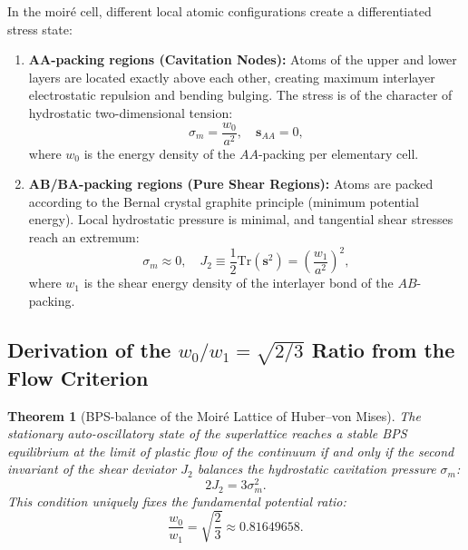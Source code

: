 \documentclass[12pt,a4paper]{article}
\newtheorem{theorem}{Theorem}
\begin{document}
	In the moiré cell, different local atomic configurations create a differentiated stress state:
	\begin{enumerate}
		\item \textbf{AA-packing regions (Cavitation Nodes):} Atoms of the upper and lower layers are located exactly above each other, creating maximum interlayer electrostatic repulsion and bending bulging. The stress is of the character of hydrostatic two-dimensional tension:
		\begin{equation}
			\sigma_m = \frac{w_0}{a^2}, \quad \mathbf{s}_{AA} = 0,
		\end{equation}
		where $w_0$ is the energy density of the $AA$-packing per elementary cell.
		
		\item \textbf{AB/BA-packing regions (Pure Shear Regions):} Atoms are packed according to the Bernal crystal graphite principle (minimum potential energy). Local hydrostatic pressure is minimal, and tangential shear stresses reach an extremum:
		\begin{equation}
			\sigma_m \approx 0, \quad J_2 \equiv \frac{1}{2}\mathrm{Tr}(\mathbf{s}^2) = \left( \frac{w_1}{a^2} \right)^2,
		\end{equation}
		where $w_1$ is the shear energy density of the interlayer bond of the $AB$-packing.
	\end{enumerate}
	
	\subsection{Derivation of the $w_0/w_1 = \sqrt{2/3}$ Ratio from the Flow Criterion}
	\begin{theorem}[BPS-balance of the Moiré Lattice of Huber--von Mises]
		The stationary auto-oscillatory state of the superlattice reaches a stable BPS equilibrium at the limit of plastic flow of the continuum if and only if the second invariant of the shear deviator $J_2$ balances the hydrostatic cavitation pressure $\sigma_m$:
		\begin{equation}
			2 J_2 = 3 \sigma_m^2.
		\end{equation}
		This condition uniquely fixes the fundamental potential ratio:
		\begin{equation}
			\frac{w_0}{w_1} = \sqrt{\frac{2}{3}} \approx 0.81649658.
		\end{equation}
	\end{theorem}
	
\end{document}
